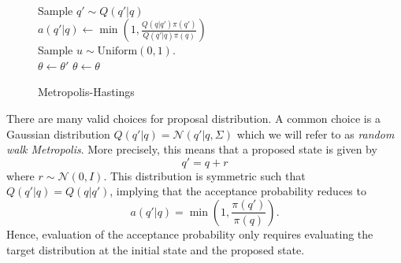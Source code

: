 \begin{figure}[H]
    \begin{algorithm}[H]
      \caption{Metropolis-Hastings}\label{algo:general_metropolis}
      \begin{algorithmic}
        \\
        \State Sample $q' \sim Q(q'|q)$\\
        \State $\displaystyle{a(q'|q) \leftarrow \min \left(1, \frac{Q(q|q')\pi(q')}{Q(q'|q)\pi (q)}\right)}$\\
        \State Sample $u \sim \text{Uniform}(0,1)$. \\
          \State $\theta \leftarrow \theta'$ 
        \Else
          \State $\theta \leftarrow \theta$  
        \EndIf\\
        \EndProcedure
      \end{algorithmic}
    \end{algorithm}
  \end{figure}

There are many valid choices for proposal distribution. A common choice is a Gaussian distribution $Q(q'|q) = \mathcal{N}(q'|q, \Sigma)$
which we will refer to as \textit{random walk Metropolis}.
More precisely, this means that a proposed state is given by
\begin{equation}
    q' = q + r
\end{equation}
where $r \sim \mathcal{N}(0, I)$. This distribution is symmetric such that $Q(q'|q) = Q(q|q')$, implying that the acceptance probability
reduces to
\begin{equation}\label{eq:symmetric_acceptance_prob}
    a(q'|q) = \min \left(1, \frac{\pi(q')}{\pi(q)}\right).
\end{equation}
Hence, evaluation of the acceptance probability only requires evaluating the target distribution at the initial state and the proposed state.

